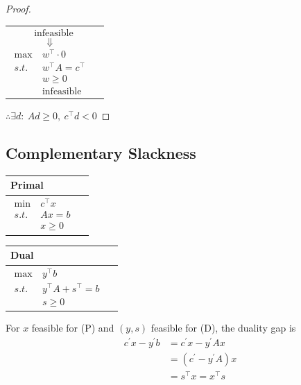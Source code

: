 \documentclass[11pt]{article}
\numberwithin{equation}{section}
\begin{document}
\begin{theorem}
\begin{proof}
\begin{minipage}[t]{.5\linewidth}
\begin{tabular}{ll}
{\begin{align*}
                        &\text{infeasible}
                \end{align*}
                $$\Downarrow$$
                \begin{align*}
                    \max \ & w^\top  \cdot 0 \\
                        s.t. \ & w^\top A = c^\top  \\
                        & w \geq 0 \\
                        &\text{infeasible}
                \end{align*}
                }
            \end{tabular}
        \end{minipage}
        $\therefore \exists d: \ Ad \geq 0,\ c^\top d < 0$
    \end{proof}
\end{theorem}

\subsection{Complementary Slackness}
\begin{table}[!htb]
    \begin{minipage}[t]{.5\linewidth}
        \vspace{0pt}
        \centering
        \begin{tabular}{ll}
            Primal \\ \hline
            \parbox{5cm}{\begin{align*}
                \min \ & c^\top x \\
                s.t. \ & Ax= b \\
                \ & x \geq 0
            \end{align*}}
        \end{tabular}
    \end{minipage}%
    \begin{minipage}[t]{.5\linewidth}
        \vspace{0pt}
        \centering
        \begin{tabular}{ll}
            Dual \\ \hline
            \parbox{5cm}{\begin{align*}
                \max \ & y^\top b \\
                s.t. \ &y^\top A +s^\top  = b \\
                &s \geq 0
            \end{align*}}
        \end{tabular}
    \end{minipage} 
\end{table}
For $x$ feasible for (P) and $(y, s)$ feasible for (D), the duality gap is
\begin{align*}
    c^{\prime} x-y^{\prime} b &= c^{\prime} x-y^{\prime} Ax \\
    &= (c^{\prime} -y^{\prime} A)x \\
    &= s^\top x = x^\top s
\end{align*}
\end{document}
